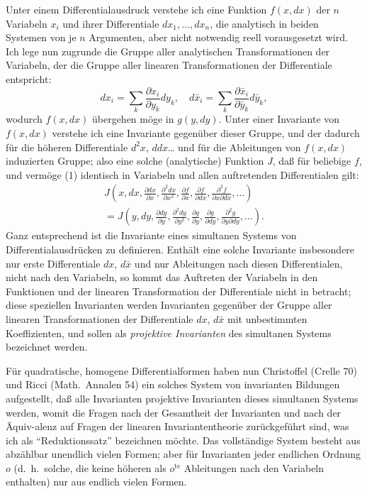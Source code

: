 \documentclass[12pt,a4paper]{article}
\begin{document}
Unter einem Differentialausdruck verstehe ich eine Funktion $f(x,dx)$ der $n$ Variabeln $x_{i}$ und ihrer Differentiale $dx_{1},\ldots,dx_{n}$, die analytisch in beiden Systemen von je $n$ Argumenten, aber nicht notwendig reell vorausgesetzt wird. Ich lege nun zugrunde die Gruppe aller analytischen Transformationen der Variabeln, der die Gruppe aller linearen Transformationen der Differentiale entspricht:
\begin{equation}\label{eq:12_1}
dx_{i}=\sum_{k}\frac{\partial x_{i}}{\partial y_{k}}dy_{k},\quad
d\bar{x}_{i}=\sum_{k}\frac{\partial\bar{x}_{i}}{\partial\bar{y}_{k}}d\bar{y}_{k},
\tag{1}
\end{equation}
wodurch $f(x,dx)$ \"ubergehen m\"oge in $g(y,dy)$. Unter einer Invariante von $f(x,dx)$ verstehe ich eine Invariante gegen\"uber dieser Gruppe, und der dadurch f\"ur die h\"oheren Differentiale $d^{2}x$, $ddx$\ldots{} und f\"ur die Ableitungen von $f(x,dx)$ induzierten Gruppe; also eine solche (analytische) Funktion $J$, da\ss{} f\"ur beliebige $f$, und verm\"oge (1) identisch in Variabeln und allen auftretenden Differentialen gilt:
\begin{multline*}
J\left(x,dx,\frac{\partial dx}{\partial x},\frac{\partial^{2}dx}{\partial x^{2}},\frac{\partial f}{\partial x},\frac{\partial f}{\partial dx},
\frac{\partial^{2}f}{\partial x\partial dx},\ldots\right)\\
=J\left(y,dy,\frac{\partial dy}{\partial y},\frac{\partial^{2}dy}{\partial y^{2}},
\frac{\partial g}{\partial y},\frac{\partial g}{\partial dy},
\frac{\partial^{2}g}{\partial y\partial dy},\ldots\right).
\end{multline*}
Ganz entsprechend ist die Invariante eines simultanen Systems von Differentialausdr\"ucken zu definieren. Enth\"alt eine solche Invariante insbesondere nur erste Differentiale $dx$, $d\bar{x}$ und nur Ableitungen nach diesen Differentialen, nicht nach den Variabeln, so kommt das Auftreten der Variabeln in den Funktionen und der linearen Transformation der Differentiale nicht in betracht; diese speziellen Invarianten werden Invarianten gegen\"uber der Gruppe aller linearen Transformationen der Differentiale $dx$, $d\bar{x}$ mit unbestimmten Koeffizienten, und sollen als \emph{projektive Invarianten} des simultanen Systems bezeichnet werden.

F\"ur quadratische, homogene Differentialformen haben nun Christoffel (Crelle 70) und Ricci (Math.\ Annalen 54) ein solches System von invarianten Bildungen aufgestellt, da\ss{} alle Invarianten projektive Invarianten dieses simultanen Systems werden, womit die Fragen nach der Gesamtheit der Invarianten und nach der \"Aquiv-alenz auf Fragen der linearen Invariantentheorie zur\"uckgef\"uhrt sind, was ich als ``Reduktionssatz'' bezeichnen m\"ochte. Das vollst\"andige System besteht aus abz\"ahlbar unendlich vielen Formen; aber f\"ur Invarianten jeder endlichen Ordnung $o$ (d.\ h.\ solche, die keine h\"oheren als $o^{\mathrm{te}}$ Ableitungen nach den Variabeln enthalten) nur aus endlich vielen Formen.
\end{document}

